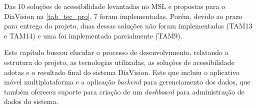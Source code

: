 Das 10 soluções de acessibilidade levantadas no MSL e propostas para o DiaVision na \autoref{tab_tec_pro},
7 foram implementadas. Porém, devido ao prazo para entrega do projeto, duas dessas soluções não foram implementadas
(TAM13 e TAM14) e uma foi implementada parcialmente (TAM9).

Este capítulo buscou elucidar o processo de desenvolvimento, relatando a estrutura do projeto, as tecnologias
utilizadas, as soluções de acessibilidade adotas e o resultado final do sistema DiaVision. Este que incluiu o
aplicativo móvel multiplataforma e a aplicação \emph{backend} para gerenciamento dos dados, que também ofereceu
suporte para criação de um \emph{dashboard} para administração de dados do sistema.